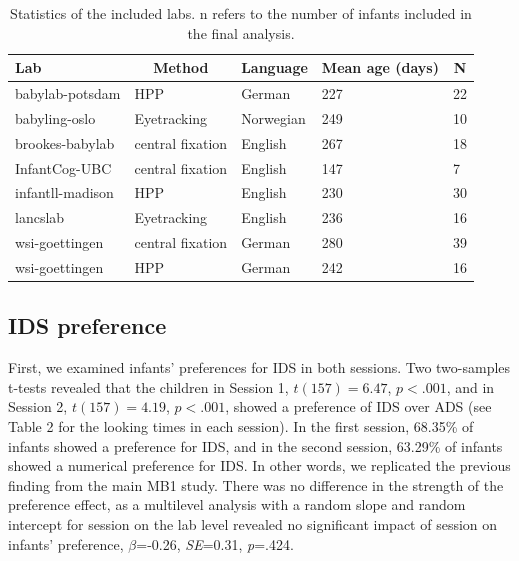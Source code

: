 \documentclass[
  man,floatsintext]{apa6}
\begin{document}
\begin{table}[tbp]

\begin{center}
\begin{threeparttable}

\caption{\label{tab:labs}Statistics of the included labs. n refers to the number of infants included in the final analysis.}

\begin{tabular}{lllll}
\toprule
Lab & \multicolumn{1}{c}{Method} & \multicolumn{1}{c}{Language} & \multicolumn{1}{c}{Mean age (days)} & \multicolumn{1}{c}{N}\\
\midrule
babylab-potsdam & HPP & German & 227 & 22\\
babyling-oslo & Eyetracking & Norwegian & 249 & 10\\
brookes-babylab & central fixation & English & 267 & 18\\
InfantCog-UBC & central fixation & English & 147 & 7\\
infantll-madison & HPP & English & 230 & 30\\
lancslab & Eyetracking & English & 236 & 16\\
wsi-goettingen & central fixation & German & 280 & 39\\
wsi-goettingen & HPP & German & 242 & 16\\
\bottomrule
\end{tabular}

\end{threeparttable}
\end{center}

\end{table}

\hypertarget{ids-preference}{%
\subsection{IDS preference}\label{ids-preference}}

First, we examined infants' preferences for IDS in both sessions. Two two-samples t-tests revealed that the children in Session 1, \(t(157) = 6.47\), \(p < .001\), and in Session 2, \(t(157) = 4.19\), \(p < .001\), showed a preference of IDS over ADS (see Table 2 for the looking times in each session).
In the first session, 68.35\% of infants showed a preference for IDS, and in the second session, 63.29\% of infants showed a numerical preference for IDS.
In other words, we replicated the previous finding from the main MB1 study. There was no difference in the strength of the preference effect, as a multilevel analysis with a random slope and random intercept for session on the lab level revealed no significant impact of session on infants' preference, \(\beta\)=-0.26, \emph{SE}=0.31, \emph{p}=.424.
\end{document}
